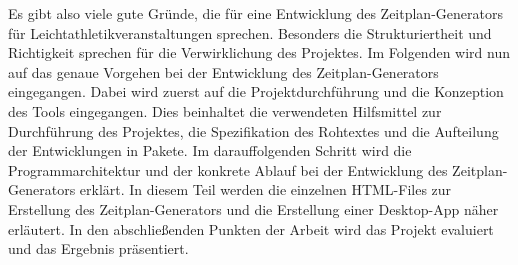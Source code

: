 Es gibt also viele gute Gründe, die für eine Entwicklung des Zeitplan-Generators für Leichtathletikveranstaltungen sprechen. Besonders die Strukturiertheit und Richtigkeit sprechen für die Verwirklichung des Projektes. Im Folgenden wird nun auf das genaue Vorgehen bei der Entwicklung des Zeitplan-Generators eingegangen. Dabei wird zuerst auf die Projektdurchführung und die Konzeption des Tools eingegangen. Dies beinhaltet die verwendeten Hilfsmittel zur Durchführung des Projektes, die Spezifikation des Rohtextes und die Aufteilung der Entwicklungen in Pakete. Im darauffolgenden Schritt wird die Programmarchitektur und der konkrete Ablauf bei der Entwicklung des Zeitplan-Generators erklärt. In diesem Teil werden die einzelnen HTML-Files zur Erstellung des Zeitplan-Generators und die Erstellung einer Desktop-App näher erläutert. In den abschließenden Punkten der Arbeit wird das Projekt evaluiert und das Ergebnis präsentiert.



